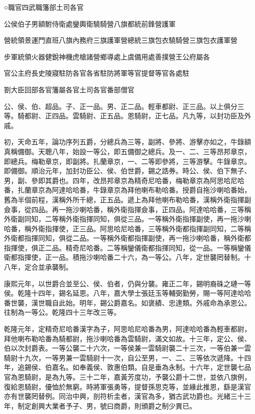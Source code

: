 
\begin{pinyinscope}
○職官四武職籓部土司各官

公侯伯子男額駙侍衛處鑾輿衛驍騎營八旗都統前鋒營護軍

營統領景運門直班八旗內務府三旗護軍營總統三旗包衣驍騎營三旗包衣護軍營

步軍統領火器健銳神機虎槍諸營鄉導處上虞備用處善撲營王公府屬各

官公主府長史陵寢駐防各官各省駐防將軍等官提督等官各處駐

劄大臣回部各官籓屬各官土司各官番部僧官

公、侯、伯、超品。子、正一品。男、正二品。輕車都尉、正三品。以上俱分三等。騎都尉、正四品。雲騎尉、正五品。恩騎尉，正七品。凡九等，以封功臣及外戚。

初，天命五年，論功序列五爵，分總兵為三等，副將、參將、游擊亦如之，牛錄額真稱備御。天聰八年，始設一等公，即五備御之總兵。及一、二、三等昂邦章京，即總兵。梅勒章京，即副將。扎蘭章京，一、二等即參將，三等游擊。牛錄章京。即備御。順治元年，加封功臣公、侯、伯世爵，錫之誥券。時公、侯、伯下無子、男，副、參即其爵也。四年，改昂邦章京為精奇尼哈番，梅勒章京為阿思哈尼哈番，扎蘭章京為阿達哈哈番，牛錄章京為拜他喇布勒哈番。授爵自拖沙喇哈番始，舊為半個前程，漢稱外所千總，正五品。遞上為拜他喇布勒哈番，漢稱外衛指揮副僉事，從四品。再一拖沙喇哈番，稱外衛指揮僉事，正四品。阿達哈哈番，三等稱外衛副同知，二等稱外衛指揮同知，俱從三品。一等稱外衛指揮副使，再一拖沙喇哈番，稱外衛指揮使，正三品。阿思哈尼哈番，三等稱外衛都指揮副同知，二等稱外衛都指揮同知，俱從二品。一等稱外衛都指揮副使，再一拖沙喇哈番，稱外衛都指揮使，俱正二品。精奇尼哈番。二等稱鑾儀衛都指揮同知，從一品。一等稱鑾儀衛都指揮使，正一品。積拖沙喇哈番二十六，為一等公。八年，定世襲罔替制。十八年，定合並承襲制。

康熙元年，以世爵合並至公、侯、伯者，仍與分襲。雍正二年，錫明裔硃之璉一等侯。乾隆十四年，錫名延恩。八年，嘉大學士張廷玉等輔弼勤勞，賜一等阿達哈哈番世襲，漢世職自此始。明年，錫公爵嘉名。如褒績、忠達類。外戚命為承恩公。往制為一等公。乾隆四十三年改三等。

乾隆元年，定精奇尼哈番漢字為子，阿思哈尼哈番為男，阿達哈哈番為輕車都尉，拜他喇布勒哈番為騎都尉，拖沙喇哈番為雲騎尉，滿文如故。十三年，定公、侯、伯以次封爵表。一等公襲二十六次，一等侯兼一雲騎尉襲二十三次，一等伯兼一雲騎尉十九次，一等男兼一雲騎尉十一次，自公至男，一、二、三等依次遞降。十四年，追錫侯、伯嘉名。如奉義侯、敦惠伯類。自是垂為永制。十六年，定世襲七品官為恩騎尉，是為九等。三十二年，嘉黃芳度功，予襲公爵十二世，並依八旗例，復給恩騎尉，優恤於無窮。時將軍張勇等，提督孫思克等，並緣此推恩，繇是漢官亦有世襲罔替例。同治中興，剖符析圭者，漢官為多，猶古武功爵也。光緒三十三年，制定創興大業者予子、男，號曰商爵，則頒爵之制少異已。


\end{pinyinscope}
